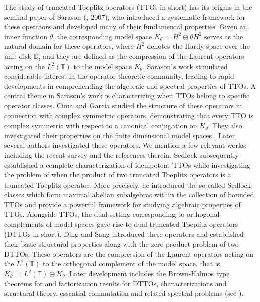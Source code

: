 \documentclass[12pt]{amsart}
\newcommand{\D}{\mathbb{D}}
\newcommand{\T}{\mathbb{T}}
\theoremstyle{definition}
\theoremstyle{plain}
\theoremstyle{definition}
\numberwithin{equation}{section}
\begin{document}
	
The study of truncated Toeplitz operators (TTOs in short) has its origins in the seminal paper of Sarason (\cite{DS}, 2007), who introduced a systematic framework for these operators and developed many of their fundamental properties. Given an inner function $\theta$, the corresponding model space $K_{\theta}=H^2\ominus\theta H^2$ serves as the natural domain for these operators, where $H^2$ denotes the Hardy space over the unit disk $\D$, and they are defined as the compression of the Laurent operators acting on the $L^2(\T)$ to the model space $K_{\theta}$. 
Sarason's work stimulated considerable interest in the operator-theoretic community, leading to rapid developments in comprehending the algebraic and spectral properties of TTOs. A central theme in Sarason's work is characterizing when TTOs belong to specific operator classes. Cima and Garcia \cite{CIMA-GARCIA-ROSS-WOGEN} studied the structure of these operators in connection with complex symmetric operators, demonstrating that every TTO is complex symmetric with respect to a canonical conjugation on $K_{\theta}$. They also investigated their properties on the finite dimensional model spaces \cite{CIMA-ROSS-WOGEN}. Later, several authors investigated these operators. We mention a few relevant works: \cite{B-C-F-M-T,BARANOV-BESSONOV-KAPUSTIN,G-ROSS-W,S-T-Z} including the recent survey \cite{ICF} and the references therein. Sedlock \cite{NS} subsequently established a complete characterization of idempotent TTOs while investigating the problem of when the product of two truncated Toeplitz operators is a truncated Toeplitz operator. More precisely, he introduced the so-called Sedlock classes which form maximal abelian subalgebras within the collection of bounded TTOs and provide a powerful framework for studying algebraic properties of TTOs.	
Alongside TTOs, the dual setting corresponding to orthogonal complements of model spaces gave rise to dual truncated Toeplitz operators (DTTOs in short). Ding and Sang \cite{XD} introduced these operators and established their basic structural properties along with the zero product problem of two DTTOs. These operators are the compression of the Laurent operators acting on the $L^2(\T)$ to the orthogonal complement of the model space, that is, $K_{\theta}^{\perp}=L^2(\T)\ominus K_{\theta}$.   
Later development includes the Brown-Halmos type theorems for and factorization results for DTTOs, characterizations and structural theory, essential commutation and related spectral problems (see \cite{C Gu, LI-SANG-DING,SANG-QIN-DING}).
	
\end{document}
